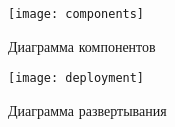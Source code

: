 \documentclass[a4paper,14pt]{extarticle}
\begin{document}
\newpage
{\centering
}

\label{sec:pril}

\begin{figure}[h!]
	\centering
	\texttt{[image: components]}
	\caption{Диаграмма компонентов}
	\label{img:components}
\end{figure}
\newpage
\begin{figure}[htbp]
	\centering
	\texttt{[image: deployment]}
	\caption{Диаграмма развертывания}
	\label{img:deployment}
\end{figure}

	
\end{document}
